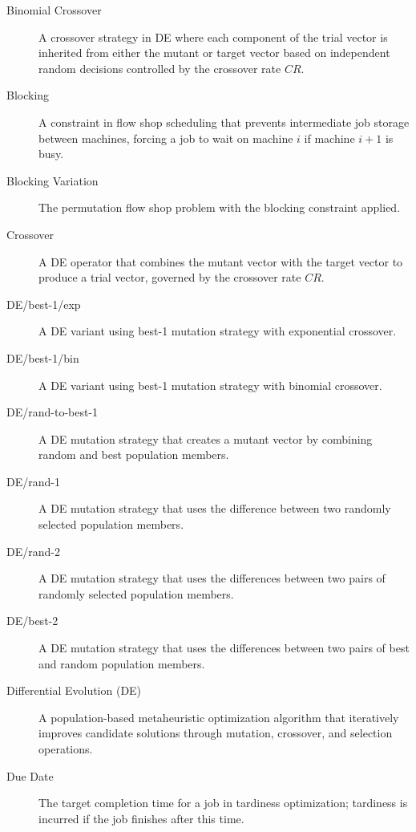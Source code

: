 \documentclass{article}
\begin{document}
\begin{description}
    \item[Binomial Crossover] A crossover strategy in DE where each component of the trial vector is inherited from either the mutant or target vector based on independent random decisions controlled by the crossover rate $CR$.
    
    \item[Blocking] A constraint in flow shop scheduling that prevents intermediate job storage between machines, forcing a job to wait on machine $i$ if machine $i+1$ is busy.
    
    \item[Blocking Variation] The permutation flow shop problem with the blocking constraint applied.
    
    \item[Crossover] A DE operator that combines the mutant vector with the target vector to produce a trial vector, governed by the crossover rate $CR$.
    
    \item[DE/best-1/exp] A DE variant using best-1 mutation strategy with exponential crossover.
    
    \item[DE/best-1/bin] A DE variant using best-1 mutation strategy with binomial crossover.
    
    \item[DE/rand-to-best-1] A DE mutation strategy that creates a mutant vector by combining random and best population members.
    
    \item[DE/rand-1] A DE mutation strategy that uses the difference between two randomly selected population members.
    
    \item[DE/rand-2] A DE mutation strategy that uses the differences between two pairs of randomly selected population members.
    
    \item[DE/best-2] A DE mutation strategy that uses the differences between two pairs of best and random population members.
    
    \item[Differential Evolution (DE)] A population-based metaheuristic optimization algorithm that iteratively improves candidate solutions through mutation, crossover, and selection operations.
    
    \item[Due Date] The target completion time for a job in tardiness optimization; tardiness is incurred if the job finishes after this time.
    

\end{description}
\end{document}
